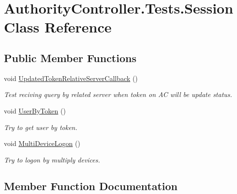 \hypertarget{class_authority_controller_1_1_tests_1_1_session}{}\section{Authority\+Controller.\+Tests.\+Session Class Reference}
\label{class_authority_controller_1_1_tests_1_1_session}
\subsection*{Public Member Functions}
\begin{DoxyCompactItemize}
\item 
void \mbox{\hyperlink{class_authority_controller_1_1_tests_1_1_session_ad4cb8f6d25fa80e9d64d174b45144331}{Updated\+Token\+Relative\+Server\+Callback}} ()
\begin{DoxyCompactList}\small\item\em Test reciving query by related server when token on AC will be update status. \end{DoxyCompactList}\item 
void \mbox{\hyperlink{class_authority_controller_1_1_tests_1_1_session_ac7fca191024ad023affcc13a9e380788}{User\+By\+Token}} ()
\begin{DoxyCompactList}\small\item\em Try to get user by token. \end{DoxyCompactList}\item 
void \mbox{\hyperlink{class_authority_controller_1_1_tests_1_1_session_a454260fa1b12b77664fcecea7b4c86aa}{Multi\+Device\+Logon}} ()
\begin{DoxyCompactList}\small\item\em Try to logon by multiply devices. \end{DoxyCompactList}\end{DoxyCompactItemize}


\subsection{Member Function Documentation}
\mbox{\label{class_authority_controller_1_1_tests_1_1_session_a454260fa1b12b77664fcecea7b4c86aa}} 
